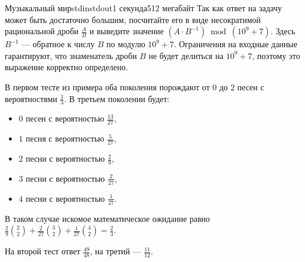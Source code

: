 \begin{problem}{Музыкальный мир}{stdin}{stdout}{1 секунда}{512 мегабайт}
\OutputFile
Так как ответ на задачу может быть достаточно большим, посчитайте его в виде несократимой рациональной дроби $\frac{A}{B}$ и выведите значение $(A \cdot B^{-1}) \bmod (10^{9} + 7)$. Здесь $B^{-1}$ --- обратное к числу $B$ по модулю $10^{9} + 7$. Ограничения на входные данные гарантируют, что знаменатель дроби $B$ не будет делиться на $10^{9} + 7$, поэтому это выражение корректно определено.


\Examples

\begin{example}
%
%
%
\end{example}

\Note
В первом тесте из примера оба поколения порождают от $0$ до $2$ песен с вероятностями $\frac{1}{3}$.
В третьем поколении будет:
\begin{itemize}
\item $0$ песен с вероятностью $\frac{13}{27}$,
\item $1$ песня с вероятностью $\frac{5}{27}$,
\item $2$ песни с вероятностью $\frac{2}{9}$,
\item $3$ песни с вероятностью $\frac{2}{27}$,
\item $4$ песни с вероятностью $\frac{1}{27}$.
\end{itemize}

В таком случае искомое математическое ожидание равно 
$\frac{2}{9}\binom{2}{2} + \frac{2}{27}\binom{3}{2} + \frac{1}{27}\binom{4}{2} = \frac{2}{3}$.

На второй тест ответ $\frac{49}{48}$, на третий --- $\frac{11}{12}$.

\end{problem}
